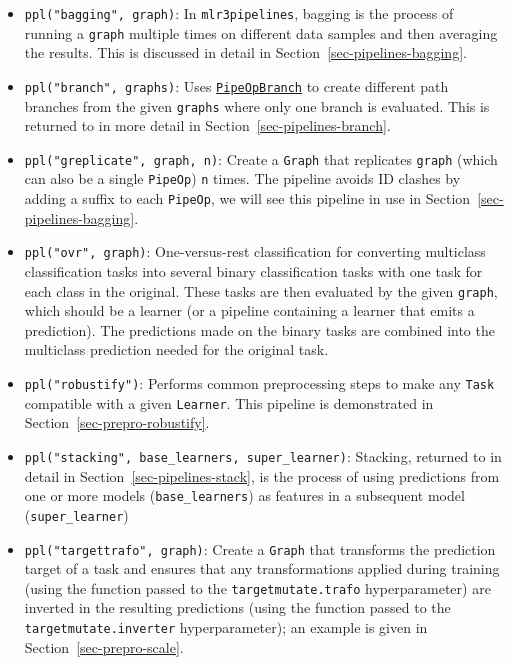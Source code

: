 \begin{itemize}
\tightlist
\item
  \texttt{ppl("bagging",\ graph)}: In \texttt{mlr3pipelines},
  bagging is the process of running a \texttt{graph}
  multiple times on different data samples and then averaging the
  results. This is discussed in detail in
  Section~\ref{sec-pipelines-bagging}.
\item
  \texttt{ppl("branch",\ graphs)}: Uses
  \href{https://mlr3pipelines.mlr-org.com/reference/mlr_pipeops_branch.html}{\texttt{PipeOpBranch}}
  to create different path branches from the given \texttt{graphs} where
  only one branch is evaluated. This is returned to in more detail in
  Section~\ref{sec-pipelines-branch}.
\item
  \texttt{ppl("greplicate",\ graph,\ n)}: Create a \texttt{Graph} that
  replicates \texttt{graph} (which can also be a single \texttt{PipeOp})
  \texttt{n} times. The pipeline avoids ID clashes by adding a suffix to
  each \texttt{PipeOp}, we will see this pipeline in use in
  Section~\ref{sec-pipelines-bagging}.
\item
  \texttt{ppl("ovr",\ graph)}: One-versus-rest
  classification for converting
  multiclass classification tasks into
  several binary classification tasks with one task for each class in
  the original. These tasks are then evaluated by the given
  \texttt{graph}, which should be a learner (or a pipeline containing a
  learner that emits a prediction). The predictions made on the binary
  tasks are combined into the multiclass prediction needed for the
  original task.
\item
  \texttt{ppl("robustify")}: Performs common preprocessing steps to make
  any \texttt{Task} compatible with a given \texttt{Learner}. This
  pipeline is demonstrated in Section~\ref{sec-prepro-robustify}.
\item
  \texttt{ppl("stacking",\ base\_learners,\ super\_learner)}:
  Stacking, returned to in detail in
  Section~\ref{sec-pipelines-stack}, is the process of using predictions
  from one or more models (\texttt{base\_learners}) as features in a
  subsequent model (\texttt{super\_learner})
\item
  \texttt{ppl("targettrafo",\ graph)}: Create a \texttt{Graph} that
  transforms the prediction target of a task and ensures that any
  transformations applied during training (using the function passed to
  the \texttt{targetmutate.trafo} hyperparameter) are inverted in the
  resulting predictions (using the function passed to the
  \texttt{targetmutate.inverter} hyperparameter); an example is given in
  Section~\ref{sec-prepro-scale}.
\end{itemize}

